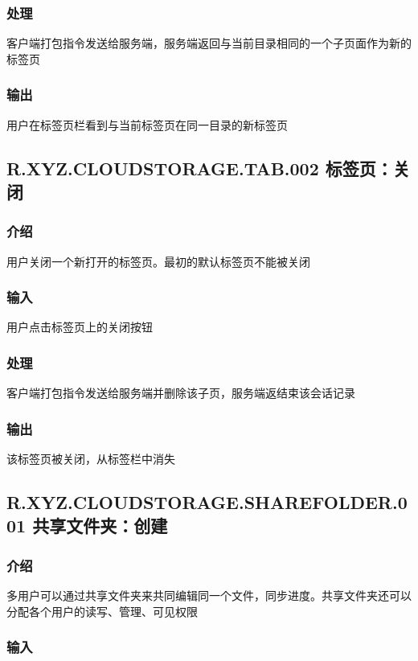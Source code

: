 \subsubsection{处理} 
客户端打包指令发送给服务端，服务端返回与当前目录相同的一个子页面作为新的标签页
\subsubsection{输出}
用户在标签页栏看到与当前标签页在同一目录的新标签页

\subsection{R.XYZ.CLOUDSTORAGE.TAB.002 标签页：关闭}

\subsubsection{介绍}
用户关闭一个新打开的标签页。最初的默认标签页不能被关闭
\subsubsection{输入} 
用户点击标签页上的关闭按钮
\subsubsection{处理} 
客户端打包指令发送给服务端并删除该子页，服务端返结束该会话记录
\subsubsection{输出}
该标签页被关闭，从标签栏中消失

\subsection{R.XYZ.CLOUDSTORAGE.SHAREFOLDER.001 共享文件夹：创建}

\subsubsection{介绍}

多用户可以通过共享文件夹来共同编辑同一个文件，同步进度。共享文件夹还可以分配各个用户的读写、管理、可见权限

\subsubsection{输入} 

